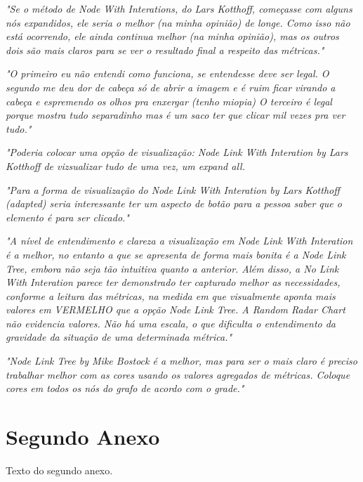 \begin{anexosenv}
\textit{"Se o método de Node With Interations, do Lars Kotthoff, começasse com
alguns nós expandidos, ele seria o melhor (na minha opinião) de longe. Como
isso não está ocorrendo, ele ainda continua melhor (na minha opinião), mas os
outros dois são mais claros para se ver o resultado final a respeito das
métricas."}

\textit{"O primeiro eu não entendi como funciona, se entendesse deve ser legal. O
segundo me deu dor de cabeça só de abrir a imagem e é ruim ficar virando a
cabeça e espremendo os olhos pra enxergar (tenho miopia)  O terceiro é legal
porque mostra tudo separadinho mas é um saco ter que clicar mil vezes pra ver
tudo."}

\textit{"Poderia colocar uma opção de visualização: Node Link With Interation
by Lars Kotthoff de vizsualizar tudo de uma vez, um expand all.}

\textit{"Para a forma de visualização do Node Link With Interation by Lars
Kotthoff (adapted) seria interessante ter um aspecto de botão para a pessoa
saber que o elemento é para ser clicado."}

\textit{"A nível de entendimento e clareza a visualização em Node Link With
Interation é a melhor, no entanto a que se apresenta de forma mais bonita é a
Node Link Tree, embora não seja tão intuitiva quanto a anterior. Além disso, a
No Link With Interation parece ter demonstrado ter capturado melhor as
necessidades, conforme a leitura das métricas, na medida em que visualmente
aponta mais valores em VERMELHO que a opção Node Link Tree. A Random Radar
Chart não evidencia valores. Não há uma escala, o que dificulta
o entendimento da gravidade da situação de uma determinada métrica."}

\textit{"Node Link Tree by Mike Bostock é a melhor, mas para ser o mais claro é
preciso trabalhar melhor com as cores usando os valores agregados de métricas.
Coloque cores em todos os nós do grafo de acordo com o grade."}


\chapter{Segundo Anexo}

Texto do segundo anexo.

\end{anexosenv}
